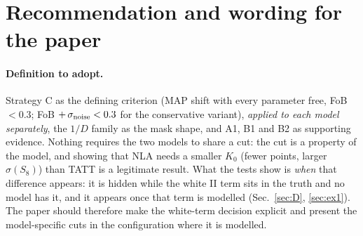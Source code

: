 \documentclass[11pt]{article}
\begin{document}
\begin{table}[H]\centering\small
\caption{Full fits, Gaussian covariance versus \texttt{example1\_cov}.
$\sigma(S_8)$: case A, NLA (Fisher).}
\label{tab:ex1}
\resizebox{\textwidth}{!}{}
\end{table}

\begin{table}[H]\centering\small
\caption{Separate $\xi_\pm$ masks with \texttt{example1\_cov}, full fits.}
\label{tab:ex1split}

\end{table}

\section{Recommendation and wording for the paper}\label{sec:rec}

\paragraph{Definition to adopt.} Strategy C as the defining criterion
(MAP shift with every parameter free, FoB $< 0.3$; FoB $+\,\sigma_{\rm noise}
< 0.3$ for the conservative variant), \emph{applied to each model separately},
the $1/D$ family as the mask shape, and A1, B1 and B2 as supporting evidence.
Nothing requires the two models to share a cut: the cut is a property of the
model, and showing that NLA needs a smaller $K_0$ (fewer points, larger
$\sigma(S_8)$) than TATT is a legitimate result. What the tests show is
\emph{when} that difference appears: it is hidden while the white II term
sits in the truth and no model has it, and it appears once that term is
modelled (Sec.~\ref{sec:D}, \ref{sec:ex1}). The paper should therefore make
the white-term decision explicit and present the model-specific cuts in the
configuration where it is modelled.
\end{document}
